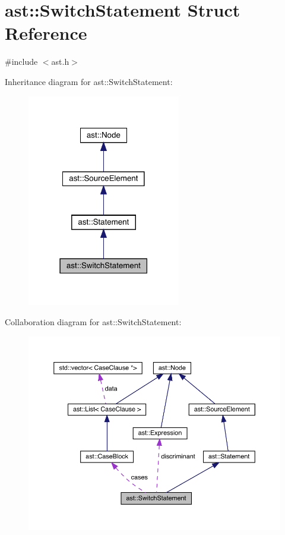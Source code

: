 \hypertarget{structast_1_1_switch_statement}{}\section{ast\+:\+:Switch\+Statement Struct Reference}
\label{structast_1_1_switch_statement}


{\ttfamily \#include $<$ast.\+h$>$}



Inheritance diagram for ast\+:\+:Switch\+Statement\+:\nopagebreak
\begin{figure}[H]
\begin{center}
\leavevmode
\includegraphics[width=190pt]{structast_1_1_switch_statement__inherit__graph}
\end{center}
\end{figure}


Collaboration diagram for ast\+:\+:Switch\+Statement\+:\nopagebreak
\begin{figure}[H]
\begin{center}
\leavevmode
\includegraphics[width=350pt]{structast_1_1_switch_statement__coll__graph}
\end{center}
\end{figure}
